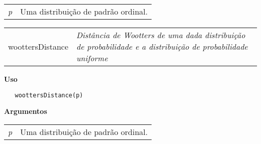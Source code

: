 \begin{table}[!ht]
\begin{center}
\begin{tabularx}{\textwidth}{X X}
\hspace{0.5cm} \textit{p} & Uma distribuição de padrão ordinal.\\
\end{tabularx}
\end{center}
\end{table} 

\newpage

\hrulefill   

\begin{table}[!ht]
\begin{center}
\begin{tabularx}{\textwidth}{ X X}
\hspace{0.5cm} woottersDistance & \textit{Distância de Wootters de uma dada distribuição de probabilidade e a distribuição de probabilidade uniforme}\\
\end{tabularx}
\end{center}
\end{table} 

\vspace{-0.5cm}

\hrulefill  

\vspace{0.5cm}

\textbf{Uso}

\begin{lstlisting}
   woottersDistance(p)
\end{lstlisting}

\vspace{0.5cm}

\textbf{Argumentos}

\begin{table}[!ht]
\begin{center}
\begin{tabularx}{\textwidth}{X X}
\hspace{0.5cm} \textit{p} & Uma distribuição de padrão ordinal.\\
\end{tabularx}
\end{center}
\end{table} 

